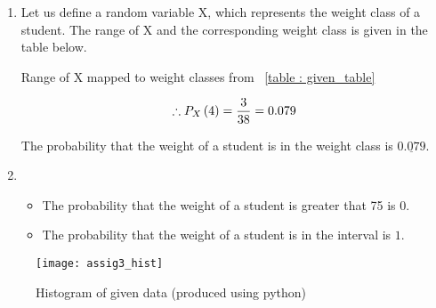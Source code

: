 \documentclass[journal,12pt,twocolumn]{IEEEtran}
\begin{document}
	\begin{enumerate}[label = \brak{\textbf{\roman*}}]
	\item
	
	Let us define a random variable X, which represents the weight class of a student. The range of X and the corresponding weight class is given in the table below.
	
	\begin{table}[h!tb]
	
		\centering
		
		\caption{Range of X mapped to weight classes from ~\ref{table : given_table}}
		
		
		
		\label{table : range_table}
		
	\end{table}
	
	
	\begin{align}
		\therefore P_X \left(4\right) = \frac{3}{38} = 0.079
	\end{align}
	
	
	The probability that the weight of a student is in the weight class  is $\underline{0.079}.$ 
		
	
	\item
	
	\begin{itemize}
	
		\item The probability that the weight of a student is greater that 75 is $0$.
		
		\item The probability that the weight of a student is in the interval  is $1$.
	
	\end{itemize}
	
	\end{enumerate}
	
	\begin{figure}[!htb]
	
		\texttt{[image: assig3\_hist]}
		\caption{Histogram of given data (produced using python)}
		
	\end{figure}
\end{document}
